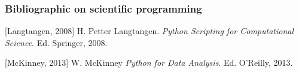 \documentclass[10pt,compress]{beamer} %
\begin{document}
\begin{frame}
  \frametitle<presentation>{Bibliographic on scientific programming}

  \begin{thebibliography}{2}

  \beamertemplatebookbibitems
        
     [Langtangen, 2008]
     H. Petter Langtangen.
    \newblock \emph{Python Scripting for Computational Science}.
    \newblock Ed. Springer, 2008.
    
    [McKinney, 2013]
     W. McKinney
    \newblock \emph{Python for Data Analysis}.
    \newblock Ed. O'Reilly, 2013.
  
  \end{thebibliography}
\end{frame}
\end{document}
